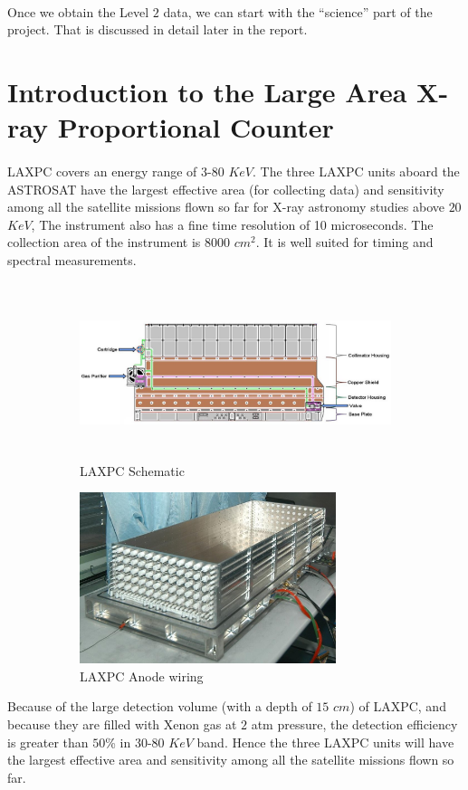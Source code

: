 \documentclass[a4paper,twoside]{report}
\numberwithin{equation}{section}
\begin{document}
\paragraph{}
Once we obtain the Level $2$ data, we can start with the “science” part of the project. That is discussed in detail later in the report. 
\newpage
\section{Introduction to the Large Area X-ray Proportional Counter}
\paragraph{}
LAXPC covers an energy range of $3$-$80$ $KeV$. The three LAXPC units aboard the ASTROSAT have the largest effective area (for collecting data) and sensitivity among all the satellite missions flown so far for X-ray astronomy studies above $20$ $KeV$, The instrument also has a fine time resolution of 10 microseconds. The collection area of the instrument is $8000$ $cm^2$. It is well suited for timing and spectral measurements. 
\paragraph{}
\begin{figure}[h]
\begin{subfigure}{0.6\textwidth}
\includegraphics[width=1.0\linewidth, height=5cm]{image297_small.png} 
\caption{LAXPC Schematic}
\label{lAXPC Schematic}
\end{subfigure}
\begin{subfigure}{0.36\textwidth}
\includegraphics[width=1.0\linewidth, height=5cm]{image298_medium.jpg}
\caption{LAXPC Anode wiring}
\label{Anode wiring LAXPC}
\end{subfigure}
\caption{}
\label{fig:LAXPC}
\end{figure}
Because of the large detection volume (with a depth of $15$ $cm$) of LAXPC, and because they are filled with Xenon gas at $2$ atm pressure, the detection efficiency is greater than $50$\% in $30$-$80$ $KeV$ band. Hence the three LAXPC units will have the largest effective area and sensitivity among all the satellite missions flown so far.
\end{document}

